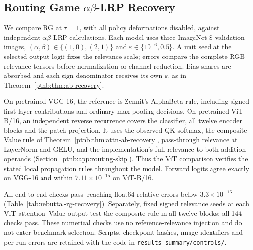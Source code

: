 \begin{table}[!ht]
\centering\small
\setlength{\tabcolsep}{3pt}

\caption[SG original-forward pooling control]{VGG-16 SG original-forward max-pooling control on the 50-image validation split. Each cell lists recompute/cached means followed by the paired cached-minus-recompute difference and its interval.}
\label{tab:rebuttal-sg-pooling}
\end{table}

\begin{changed}
\section{Routing Game \texorpdfstring{$\alpha\beta$}{alpha-beta}-LRP Recovery}\label{app:rebuttal-rg}

We compare RG at $\tau=1$, with all policy deformations disabled, against independent $\alpha\beta$-LRP calculations. Each model uses three ImageNet-S validation images, $(\alpha,\beta)\in\{(1,0),(2,1)\}$ and $\varepsilon\in\{10^{-6},0.5\}$. A unit seed at the selected output logit fixes the relevance scale; errors compare the complete RGB relevance tensors before normalization or channel reduction. Bias shares are absorbed and each sign denominator receives its own $\varepsilon$, as in Theorem~\ref{ptnb:thm:ab-recovery}.

On pretrained VGG-16, the reference is Zennit's AlphaBeta rule, including signed first-layer contributions and ordinary max-pooling decisions. On pretrained ViT-B/16, an independent reverse recurrence covers the classifier, all twelve encoder blocks and the patch projection. It uses the observed QK-softmax, the composite Value rule of Theorem~\ref{ptnb:thm:attn-ab-recovery}, pass-through relevance at LayerNorm and GELU, and the implementation's full relevance to both addition operands (Section~\ref{ptnb:app:routing-skip}). Thus the ViT comparison verifies the stated local propagation rules throughout the model. Forward logits agree exactly on VGG-16 and within $7.11\times10^{-15}$ on ViT-B/16.

All end-to-end checks pass, reaching float64 relative errors below $3.3\times10^{-16}$ (Table~\ref{tab:rebuttal-rg-recovery}). Separately, fixed signed relevance seeds at each ViT attention--Value output test the composite rule in all twelve blocks: all 144 checks pass. These numerical checks use no reference-relevance injection and do not enter benchmark selection. Scripts, checkpoint hashes, image identifiers and per-run errors are retained with the code in \nolinkurl{results_summary/controls/}.


\end{changed}
